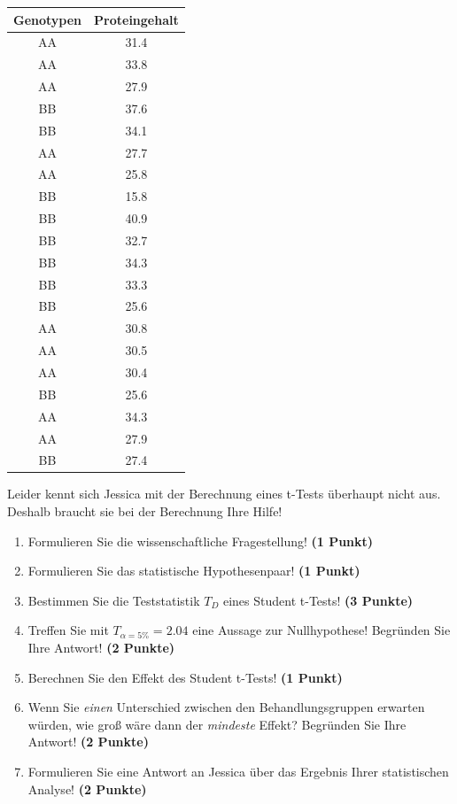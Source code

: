 \documentclass[a4paper, 9pt]{scrartcl}\usepackage[]{graphicx}\usepackage[]{xcolor}
\begin{document}
\begin{table}[!h]
\centering
\begin{tabular}{cc}
\toprule
Genotypen & Proteingehalt\\
\midrule
AA & 31.4\\
AA & 33.8\\
AA & 27.9\\
BB & 37.6\\
BB & 34.1\\
\addlinespace
AA & 27.7\\
AA & 25.8\\
BB & 15.8\\
BB & 40.9\\
BB & 32.7\\
\addlinespace
BB & 34.3\\
BB & 33.3\\
BB & 25.6\\
AA & 30.8\\
AA & 30.5\\
\addlinespace
AA & 30.4\\
BB & 25.6\\
AA & 34.3\\
AA & 27.9\\
BB & 27.4\\
\bottomrule
\end{tabular}
\end{table}



Leider kennt sich Jessica mit der Berechnung eines t-Tests überhaupt nicht aus. Deshalb braucht sie bei der Berechnung Ihre Hilfe!

\begin{enumerate}
  \item Formulieren Sie die wissenschaftliche Fragestellung! \textbf{(1 Punkt)}
  \item Formulieren Sie das statistische Hypothesenpaar! \textbf{(1 Punkt)}
  \item Bestimmen Sie die Teststatistik $T_{D}$ eines Student t-Tests! \textbf{(3 Punkte)}
\item Treffen Sie mit $T_{\alpha = 5\%} = 2.04$ eine Aussage zur Nullhypothese! Begründen Sie Ihre Antwort! \textbf{(2 Punkte)}
\item Berechnen Sie den Effekt des Student t-Tests! \textbf{(1 Punkt)}
\item Wenn Sie \textit{einen} Unterschied zwischen den Behandlungsgruppen erwarten würden, wie groß wäre dann der \textit{mindeste} Effekt? Begründen Sie Ihre Antwort! \textbf{(2 Punkte)}
\item Formulieren Sie eine Antwort an Jessica über das Ergebnis Ihrer statistischen Analyse! \textbf{(2 Punkte)}
\end{enumerate} 
\clearpage
\end{document}
